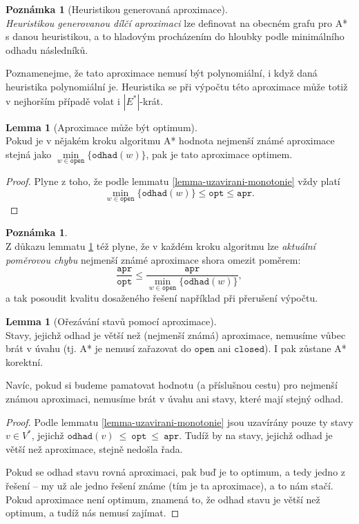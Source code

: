 \documentclass[12pt,notitlepage,fleqn]{report} %
\theoremstyle{definition}
\newtheorem{lemma}[veta]{Lemma}
\newtheorem{pozn}[veta]{Poznámka}
\newcommand{\thmlemma}[2]{\begin{lemma}[#1] \n #2 \end{lemma}}
\newcommand{\thmpozn}[2]{\begin{pozn}[#1] \n #2 \end{pozn}}
\newcommand{\thmpoznone}[1]{\begin{pozn} \n #1 \end{pozn}}
\newcommand{\dukaz}[1]{\begin{proof} #1 \end{proof}}
\def\ent{$\:$}
\def\n{\ent \\}
\newcommand{\code}[1]{\texttt{#1}}
\begin{document}
    \thmpozn{Heuristikou generovaná aproximace}{
    \label{pozn-aproximace-0}
     \emph{Heuristikou generovanou dílčí aproximaci} lze definovat na obecném grafu pro A* s danou heuristikou, a to hladovým procházením do hloubky podle minimálního odhadu následníků.
     
     Poznamenejme, že tato aproximace nemusí být polynomiální, i když daná heuristika polynomiální je. Heuristika se při výpočtu této aproximace může totiž v nejhorším případě volat i $|E^*|$-krát.
    }

    \thmlemma{Aproximace může být optimum}{
    \label{lemma-aproximace-optimum}
     Pokud je v nějakém kroku algoritmu A* hodnota nejmenší známé aproximace stejná jako $\min\limits_{w \in \code{open}} \{ \code{odhad}(w) \}$, pak je tato aproximace optimem.
    }
    \dukaz{
    Plyne z toho, že podle lemmatu \ref{lemma-uzavirani-monotonie} vždy platí 
    \[ \min\limits_{w \in \code{open}} \{ \code{odhad}(w) \} \leq \code{opt} \leq \code{apr}. \]
    }
    
    \thmpoznone{
      Z důkazu lemmatu \ref{lemma-aproximace-optimum} též plyne, že v každém kroku algoritmu lze \emph{aktuální poměrovou chybu} nejmenší známé aproximace shora omezit poměrem:
      \[ \frac{\code{apr}}{\code{opt}} \leq \frac{\code{apr}}{\min\limits_{w \in \code{open} } \{ \code{odhad}(w) \} }, \]
      a tak posoudit kvalitu dosaženého řešení například při přerušení výpočtu.
    }
    
    \thmlemma{Ořezávání stavů pomocí aproximace}{
    \label{lemma-aprox-orez}
     Stavy, jejichž odhad je větší než (nejmenší známá) aproximace, nemusíme vůbec brát v úvahu (tj. A* je nemusí zařazovat do $\code{open}$ ani $\code{closed}$). I pak zůstane A* korektní.
     
     Navíc, pokud si budeme pamatovat hodnotu (a příslušnou cestu) pro nejmenší známou aproximaci, nemusíme brát v úvahu ani stavy, které mají stejný odhad.
    }
    \dukaz{
    Podle lemmatu \ref{lemma-uzavirani-monotonie} jsou uzavírány pouze ty stavy $v \in V^*$, jejichž $\code{odhad}(v)~\leq~\code{opt}~\leq~\code{apr}$. Tudíž by na stavy, jejichž odhad je větší než aproximace, stejně nedošla řada.
    
    Pokud se odhad stavu rovná aproximaci, pak buď je to optimum, a tedy jedno z řešení -- my už ale jedno řešení známe (tím je ta aproximace), a to nám stačí. Pokud aproximace není optimum, znamená to, že odhad stavu je větší než optimum, a tudíž nás nemusí zajímat.
    }
\end{document}

